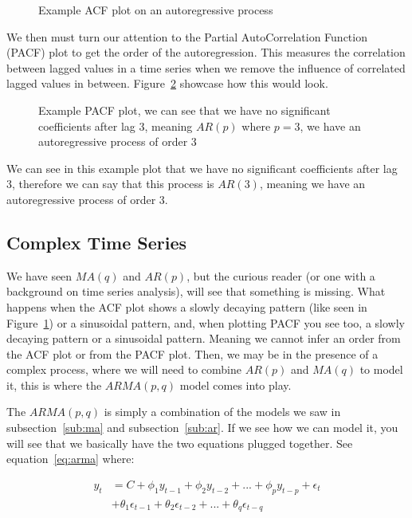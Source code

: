 \documentclass[journal]{IEEEtran}
\begin{document}
\begin{figure}[htbp]
  \centering
  
    \caption{Example ACF plot on an autoregressive process}
  \label{fig:acf-ar}
\end{figure}

We then must turn our attention to the Partial AutoCorrelation Function (PACF)
plot to get the order of the autoregression. This measures the correlation
between lagged values in a time series when we remove the influence of
correlated lagged values in between. Figure~\ref{fig:pacf} showcase how this
would look.

\begin{figure}[htbp]
  \centering
  
    \caption{Example PACF plot, we can see that we have no significant
        coefficients after lag 3, meaning $AR(p)$ where $p=3$, we have an
        autoregressive process of order 3}
    \label{fig:pacf}
\end{figure}

We can see in this example plot that we have no significant coefficients after
lag 3, therefore we can say that this process is $AR(3)$, meaning we have an
autoregressive process of order 3.

\subsection{Complex Time Series}

We have seen $MA(q)$ and $AR(p)$, but the curious reader (or one with a
background on time series analysis), will see that something is missing.  What
happens when the ACF plot shows a slowly decaying pattern (like seen in
Figure~\ref{fig:acf-ar}) or a sinusoidal pattern, and, when plotting PACF you
see too, a slowly decaying pattern or a sinusoidal pattern. Meaning we cannot
infer an order from the ACF plot or from the PACF plot. Then, we may be in the
presence of a complex process, where we will need to combine $AR(p)$ and
$MA(q)$ to model it, this is where the $ARMA(p, q)$ model comes into play.

The $ARMA(p, q)$  is simply a combination of the models we saw in
subsection~\ref{sub:ma} and subsection~\ref{sub:ar}. If we see how we can
model it, you will see that we basically have the two equations plugged
together. See equation~\ref{eq:arma} where:

\begin{equation}
\begin{aligned}
    y_t &= C + \phi_1 y_{t-1} + \phi_2 y_{t-2} +
            ... +  \phi_p y_{t-p} + \epsilon_t \\
        &+ \theta_1\epsilon_{t-1} + \theta_2\epsilon_{t-2} +
            ... +  \theta_q\epsilon_{t-q}
    \label{eq:arma}
\end{aligned}
\end{equation}
\end{document}
